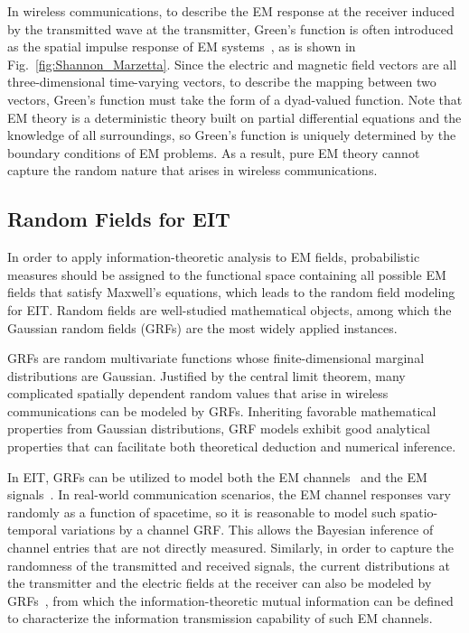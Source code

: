\documentclass[journal,twocolumn]{IEEEtran}
\begin{document}
In wireless communications, to describe the EM response at the receiver induced by the transmitted wave at the transmitter, Green's function is often introduced as the spatial impulse response of EM systems~\cite{stratton2007electromagnetic}, as is shown in Fig.~\ref{fig:Shannon_Marzetta}. Since the electric and magnetic field vectors are all three-dimensional time-varying vectors, to describe the mapping between two vectors, Green's function must take the form of a dyad-valued function. 
Note that EM theory is a deterministic theory built on partial differential equations and the knowledge of all surroundings, so Green's function is uniquely determined by the boundary conditions of EM problems.
As a result, pure EM theory cannot capture the random nature that arises in wireless communications. 

\subsection{Random Fields for EIT}
\label{Sec_2_Subsec_4}
In order to apply information-theoretic analysis to EM fields, probabilistic measures should be assigned to the functional space containing all possible EM fields that satisfy Maxwell's equations, which leads to the random field modeling for EIT. 
Random fields are well-studied mathematical objects, among which the Gaussian random fields (GRFs) are the most widely applied instances. 

GRFs are random multivariate functions whose finite-dimensional marginal distributions are Gaussian. Justified by the central limit theorem, many complicated spatially dependent random values that arise in wireless communications can be modeled by GRFs.  
Inheriting favorable mathematical properties from Gaussian distributions, GRF models exhibit good analytical properties that can facilitate both theoretical deduction and numerical inference. 

In EIT, GRFs can be utilized to model both the EM channels~\cite{marzetta2022fourier} and the EM signals~\cite{wan2022mutual}. 
In real-world communication scenarios, the EM channel responses vary randomly as a function of spacetime, so it is reasonable to model such spatio-temporal variations by a channel GRF. 
This allows the Bayesian inference of channel entries that are not directly measured. 
Similarly, in order to capture the randomness of the transmitted and received signals, the current distributions at the transmitter and the electric fields at the receiver can also be modeled by GRFs~\cite{wan2022mutual}, from which the information-theoretic mutual information can be defined to characterize the information transmission capability of such EM channels. 
\end{document}
